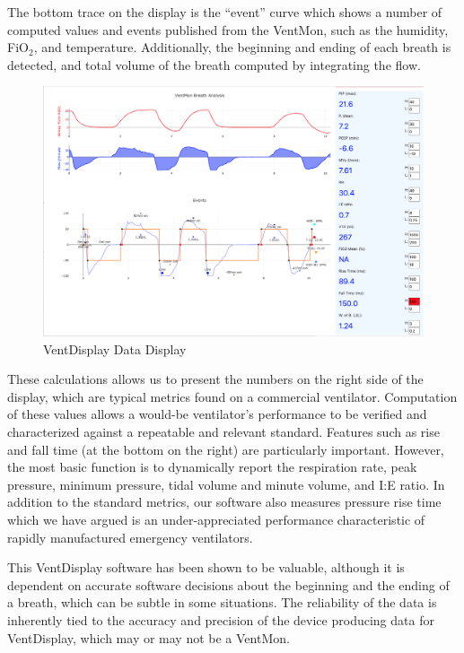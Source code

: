\documentclass[11pt, letterpaper]{article}
\begin{document}
The bottom trace on the display is the ``event'' curve which shows a number of computed values and events published from the VentMon, such as the humidity, FiO$_2$, and temperature. Additionally, the beginning and ending of each breath is detected, and total volume of the breath computed by integrating the flow.


\begin{figure}[H]
\centering
\includegraphics[width=\textwidth]{VentDisplayExample.png}
\caption{VentDisplay Data Display}
\label{fig:ventdisplay}
\end{figure}

These calculations allows us to present the numbers on the right side of the display, which are typical metrics found on a commercial ventilator. Computation of these values allows a would-be ventilator's performance to be verified and characterized against a repeatable and relevant standard. Features such as rise and fall time (at the bottom on the right) are particularly important. However, the most basic function is to dynamically report the respiration rate, peak pressure, minimum pressure, tidal volume and minute volume, and I:E ratio. In addition to the standard metrics, our software also measures pressure rise time which we have argued is an under-appreciated performance characteristic of rapidly manufactured emergency ventilators\cite{schulz2020importance}.

This VentDisplay software has been shown to be valuable, although it is dependent on accurate software decisions about the beginning and the ending of a breath, which can be subtle in some situations. The reliability of the data is inherently tied to the accuracy and precision of the device producing data for VentDisplay, which may or may not be a VentMon.
\end{document}
